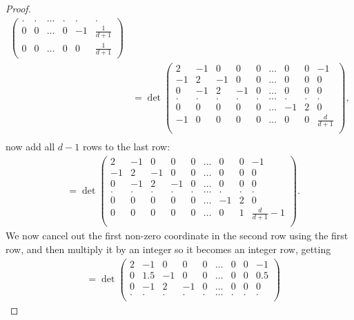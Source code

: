 \begin{proof}
\begin{align*}
\begin{pmatrix}
            . & . & \dots & . & .  & .\\
            0 & 0 & \dots & 0 & -1 & \frac{1}{d+1}\\
            0 & 0 & \dots & 0 & 0 & \frac{1}{d+1}
        \end{pmatrix}\\
        &=\det\begin{pmatrix}
            2 & -1 &  0  & 0 & 0 &\dots & 0 & 0 & -1\\
            -1 & 2  &  -1 & 0 & 0 &\dots & 0 & 0 & 0\\
            0 & -1  &  2 & -1 & 0 & \dots & 0 & 0 & 0\\
            . & .  &  . & . & . & \dots & . & . & .\\
            0 & 0  &  0 & 0 & 0 & \dots & -1 & 2 & 0\\
            -1 & 0  &  0 & 0 & 0 &\dots & 0 & 0 & \frac{d}{d+1}\\
        \end{pmatrix},\\
    \end{align*}
    now add all $d-1$ rows to the last row:
    \begin{align*}
        &=\det\begin{pmatrix}
            2 & -1 &  0  & 0 & 0 &\dots & 0 & 0 & -1\\
            -1 & 2  &  -1 & 0 & 0 &\dots & 0 & 0 & 0\\
            0 & -1  &  2 & -1 & 0 & \dots & 0 & 0 & 0\\
            . & .  &  . & . & . & \dots & . & . & .\\
            0 & 0  &  0 & 0 & 0 & \dots & -1 & 2 & 0\\
            0 & 0  &  0 & 0 & 0 &\dots & 0 & 1 & \frac{d}{d+1}-1\\
        \end{pmatrix}.
    \end{align*}
    We now cancel out the first non-zero coordinate in the second row using the first row, and then multiply it by an integer so it becomes an integer row, getting
    \begin{align*}
        &=\det\begin{pmatrix}
            2 & -1 &  0  & 0 & 0 &\dots & 0 & 0 & -1\\
            0 & 1.5  &  -1 & 0 & 0 &\dots & 0 & 0 & 0.5\\
            0 & -1  &  2 & -1 & 0 & \dots & 0 & 0 & 0\\
            . & .  &  . & . & . & \dots & . & . & .\\

\end{pmatrix}
\end{align*}
\end{proof}
